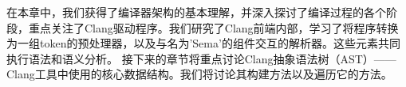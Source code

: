 在本章中，我们获得了编译器架构的基本理解，并深入探讨了编译过程的各个阶段，重点关注了Clang驱动程序。我们研究了Clang前端内部，学习了将程序转换为一组token的预处理器，以及与名为'Sema'的组件交互的解析器。这些元素共同执行语法和语义分析。
接下来的章节将重点讨论Clang抽象语法树（AST）——Clang工具中使用的核心数据结构。我们将讨论其构建方法以及遍历它的方法。

